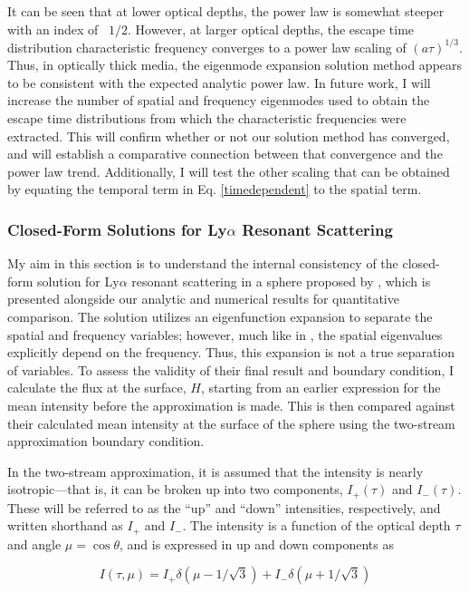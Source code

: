\documentclass[onecolumn]{aastex63}
\begin{document}
It can be seen that at lower optical depths, the power law is somewhat steeper with an index of ~$1/2$. However, at larger optical depths, the escape time distribution characteristic frequency converges to a power law scaling of $(a\tau)^{1/3}$. Thus, in optically thick media, the eigenmode expansion solution method appears to be consistent with the expected analytic power law. In future work, I will increase the number of spatial and frequency eigenmodes used to obtain the escape time distributions from which the characteristic frequencies were extracted. This will confirm whether or not our solution method has converged, and will establish a comparative connection between that convergence and the power law trend. Additionally, I will test the other scaling that can be obtained by equating the temporal term in Eq. \ref{timedependent} to the spatial term.

\subsubsection{Closed-Form Solutions for Ly$\alpha$ Resonant Scattering} \label{sec:dijkstra}

My aim in this section is to understand the internal consistency of the closed-form solution for Ly$\alpha$ resonant scattering in a sphere proposed by \cite{2006ApJ...649...14D}, which is presented alongside our analytic and numerical results for quantitative comparison. The solution utilizes an eigenfunction expansion to separate the spatial and frequency variables; however, much like in \cite{harrington1973}, the spatial eigenvalues explicitly depend on the frequency. Thus, this expansion is not a true separation of variables. To assess the validity of their final result and boundary condition, I calculate the flux at the surface, $H$, starting from an earlier expression for the mean intensity before the approximation is made. This is then compared against their calculated mean intensity at the surface of the sphere using the two-stream approximation boundary condition.

In the two-stream approximation, it is assumed that the intensity is nearly isotropic---that is, it can be broken up into two components, $I_+(\tau)$ and $I_-(\tau)$. These will be referred to as the ``up'' and ``down'' intensities, respectively, and written shorthand as $I_+$ and $I_-$. The intensity is a function of the optical depth $\tau$ and angle $\mu = \cos{\theta}$, and is expressed in up and down components as

\begin{equation}
    I(\tau, \mu) = I_+ \delta(\mu - 1/\sqrt{3}) + I_- \delta(\mu + 1/\sqrt{3})
\end{equation}
\end{document}
